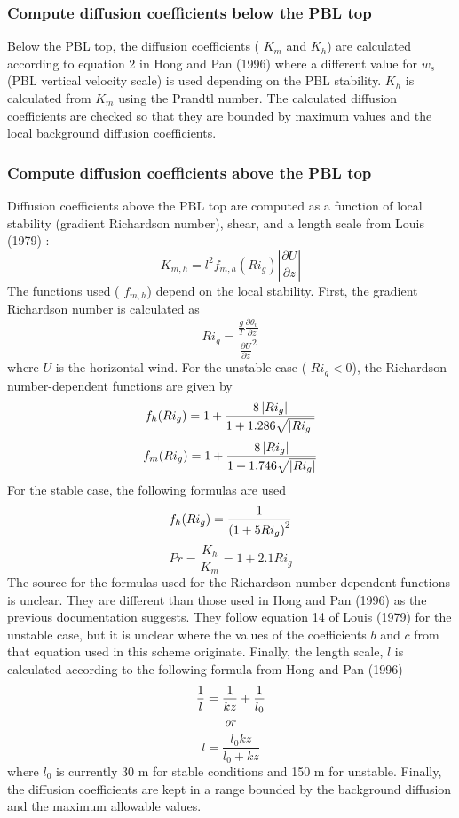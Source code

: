 \subsubsection*{Compute diffusion coefficients below the P\+BL top}

Below the P\+BL top, the diffusion coefficients ( $K_m$ and $K_h$) are calculated according to equation 2 in Hong and Pan (1996) \cite{hong_and_pan_1996} where a different value for $w_s$ (P\+BL vertical velocity scale) is used depending on the P\+BL stability. $K_h$ is calculated from $K_m$ using the Prandtl number. The calculated diffusion coefficients are checked so that they are bounded by maximum values and the local background diffusion coefficients.

\subsubsection*{Compute diffusion coefficients above the P\+BL top}

Diffusion coefficients above the P\+BL top are computed as a function of local stability (gradient Richardson number), shear, and a length scale from Louis (1979) \cite{louis_1979} \+: \[ K_{m,h}=l^2f_{m,h}(Ri_g)\left|\frac{\partial U}{\partial z}\right| \] The functions used ( $f_{m,h}$) depend on the local stability. First, the gradient Richardson number is calculated as \[ Ri_g=\frac{\frac{g}{T}\frac{\partial \theta_v}{\partial z}}{\frac{\partial U}{\partial z}^2} \] where $U$ is the horizontal wind. For the unstable case ( $Ri_g < 0$), the Richardson number-\/dependent functions are given by \[ f_h(Ri_g) = 1 + \frac{8\left|Ri_g\right|}{1 + 1.286\sqrt{\left|Ri_g\right|}}\\ \] \[ f_m(Ri_g) = 1 + \frac{8\left|Ri_g\right|}{1 + 1.746\sqrt{\left|Ri_g\right|}}\\ \] For the stable case, the following formulas are used \[ f_h(Ri_g) = \frac{1}{\left(1 + 5Ri_g\right)^2}\\ \] \[ Pr = \frac{K_h}{K_m} = 1 + 2.1Ri_g \] The source for the formulas used for the Richardson number-\/dependent functions is unclear. They are different than those used in Hong and Pan (1996) \cite{hong_and_pan_1996} as the previous documentation suggests. They follow equation 14 of Louis (1979) \cite{louis_1979} for the unstable case, but it is unclear where the values of the coefficients $b$ and $c$ from that equation used in this scheme originate. Finally, the length scale, $l$ is calculated according to the following formula from Hong and Pan (1996) \cite{hong_and_pan_1996} \[ \frac{1}{l} = \frac{1}{kz} + \frac{1}{l_0}\\ \] \[ or\\ \] \[ l=\frac{l_0kz}{l_0+kz} \] where $l_0$ is currently 30 m for stable conditions and 150 m for unstable. Finally, the diffusion coefficients are kept in a range bounded by the background diffusion and the maximum allowable values.

